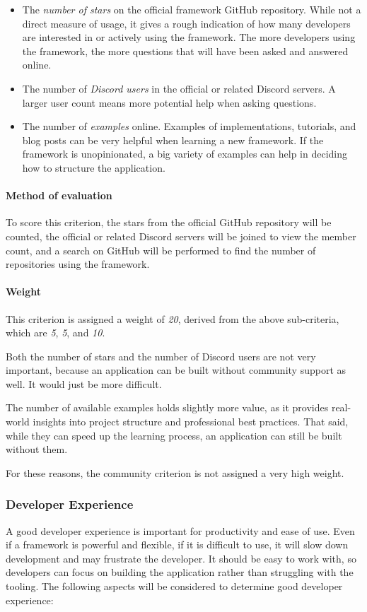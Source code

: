 \begin{itemize}
	\item The \emph{number of stars} on the official framework GitHub repository.
	      While not a direct measure of usage, it gives a rough indication of how many developers are interested in or actively using the framework.
	      The more developers using the framework, the more questions that will have been asked and answered online.
	\item The number of \emph{Discord users} in the official or related Discord servers.
	      A larger user count means more potential help when asking questions.
	\item The number of \emph{examples} online.
	      Examples of implementations, tutorials, and blog posts can be very helpful when learning a new framework.
	      If the framework is unopinionated, a big variety of examples can help in deciding how to structure the application.
\end{itemize}

\paragraph{Method of evaluation}
To score this criterion, the stars from the official GitHub repository will be counted, the official or related Discord servers will be joined to view the member count, and a search on GitHub will be performed to find the number of repositories using the framework.

\paragraph{Weight}
This criterion is assigned a weight of \emph{20}, derived from the above sub-criteria, which are \emph{5}, \emph{5}, and \emph{10}.

Both the number of stars and the number of Discord users are not very important, because an application can be built without community support as well.
It would just be more difficult.

The number of available examples holds slightly more value, as it provides real-world insights into project structure and professional best practices.
That said, while they can speed up the learning process, an application can still be built without them.

For these reasons, the community criterion is not assigned a very high weight.

\subsubsection{Developer Experience}\label{subsubsec:developer-experience}
A good developer experience is important for productivity and ease of use.
Even if a framework is powerful and flexible, if it is difficult to use, it will slow down development and may frustrate the developer.
It should be easy to work with, so developers can focus on building the application rather than struggling with the tooling.
The following aspects will be considered to determine good developer experience:

